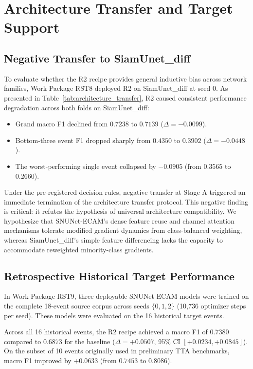 \documentclass[conference]{IEEEtran}
\begin{document}


\section{Architecture Transfer and Target Support}
\subsection{Negative Transfer to SiamUnet\_diff}
To evaluate whether the R2 recipe provides general inductive bias across network families, Work Package RST8 deployed R2 on SiamUnet\_diff at seed 0. As presented in Table~\ref{tab:architecture_transfer}, R2 caused consistent performance degradation across both folds on SiamUnet\_diff:
\begin{itemize}
    \item Grand macro F1 declined from $0.7238$ to $0.7139$ ($\Delta = -0.0099$).
    \item Bottom-three event F1 dropped sharply from $0.4350$ to $0.3902$ ($\Delta = -0.0448$).
    \item The worst-performing single event collapsed by $-0.0905$ (from $0.3565$ to $0.2660$).
\end{itemize}
Under the pre-registered decision rules, negative transfer at Stage A triggered an immediate termination of the architecture transfer protocol. This negative finding is critical: it refutes the hypothesis of universal architecture compatibility. We hypothesize that SNUNet-ECAM's dense feature reuse and channel attention mechanisms tolerate modified gradient dynamics from class-balanced weighting, whereas SiamUnet\_diff's simple feature differencing lacks the capacity to accommodate reweighted minority-class gradients.

\subsection{Retrospective Historical Target Performance}
In Work Package RST9, three deployable SNUNet-ECAM models were trained on the complete 18-event source corpus across seeds $\{0, 1, 2\}$ (10,736 optimizer steps per seed). These models were evaluated on the 16 historical target events.

Across all 16 historical events, the R2 recipe achieved a macro F1 of $0.7380$ compared to $0.6873$ for the baseline ($\Delta = +0.0507$, 95\% CI $[+0.0234, +0.0845]$). On the subset of 10 events originally used in preliminary TTA benchmarks, macro F1 improved by $+0.0633$ (from $0.7453$ to $0.8086$).
\end{document}
